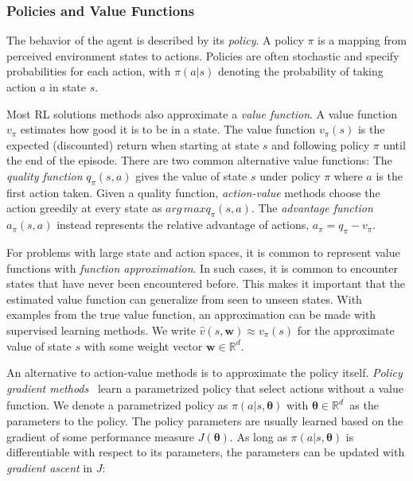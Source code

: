 \subsubsection{Policies and Value Functions}
\label{sec:policy-value}

The behavior of the agent is described by its \textit{policy}.
A policy \(\pi\) is a mapping from perceived environment states to actions.
Policies are often stochastic and specify probabilities for each action, with \(\pi(a|s)\) denoting the probability of taking action \(a\) in state \(s\).~\cite{sutton_reinforcement_2018}

Most RL solutions methods also approximate a \textit{value function}.
A value function \(v_\pi\) estimates how good it is to be in a state.
The value function \(v_\pi(s)\) is the expected (discounted) return when starting at state \(s\) and following policy \(\pi\) until the end of the episode.
There are two common alternative value functions:
The \textit{quality function} \(q_\pi(s,a)\) gives the value of state \(s\) under policy \(\pi\) where \(a\) is the first action taken.
Given a quality function, \textit{action-value} methods choose the action greedily at every state as \(arg\,max q_\pi(s, a)\).
The \textit{advantage function} \(a_\pi(s, a)\) instead represents the relative advantage of actions, \(a_\pi = q_\pi - v_\pi\).~\cite{sutton_reinforcement_2018}

For problems with large state and action spaces, it is common to represent value functions with \textit{function approximation}.
In such cases, it is common to encounter states that have never been encountered before.
This makes it important that the estimated value function can generalize from seen to unseen states.
With examples from the true value function, an approximation can be made with supervised learning methods.
We write \(\hat{v}(s,\mathbf{w}) \approx v_\pi(s)\) for the approximate value of state \(s\) with some weight vector \(\mathbf{w} \in \mathbb{R}^d\).~\cite{sutton_reinforcement_2018}

An alternative to action-value methods is to approximate the policy itself.
\textit{Policy gradient methods}~\cite{sutton_policygrad_1999} learn a parametrized policy that select actions without a value function.
We denote a parametrized policy as \(\pi(a|s,\boldsymbol{\theta})\) with \(\boldsymbol{\theta} \in \mathbb{R}^{d^\prime}\) as the parameters to the policy.
The policy parameters are usually learned based on the gradient of some performance measure \(J(\boldsymbol{\theta})\).
As long as \(\pi(a|s,\boldsymbol{\theta})\) is differentiable with respect to its parameters, the parameters can be updated with \textit{gradient ascent} in \(J\):

